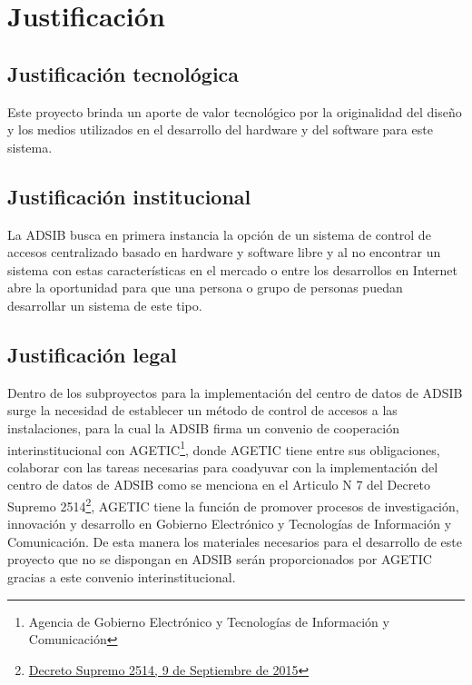 \documentclass[../principal.tex]{subfiles}
\begin{document}
  \section{Justificación}

  \subsection{Justificación tecnológica}

  Este proyecto brinda un aporte de valor tecnológico por la originalidad del diseño y los medios utilizados en el desarrollo del hardware y del software para este sistema.

  \subsection{Justificación institucional}

  La ADSIB busca en primera instancia la opción de un sistema de control de accesos centralizado basado en hardware y software libre y al no encontrar un sistema con estas características en el mercado o entre los desarrollos en Internet abre la oportunidad para que una persona o grupo de personas puedan desarrollar un sistema de este tipo.

  \subsection{Justificación legal}

  Dentro de los subproyectos para la implementación del centro de datos de ADSIB surge la necesidad de establecer un método de control de accesos a las instalaciones, para la cual la ADSIB firma un convenio de cooperación interinstitucional con AGETIC\footnote{Agencia de Gobierno Electrónico y Tecnologías de Información y Comunicación}, donde AGETIC tiene entre sus obligaciones, colaborar con las tareas necesarias para coadyuvar con la implementación del centro de datos de ADSIB como se menciona en el Articulo N\degree{} 7 del Decreto Supremo 2514\footnote{\href{http://www.derechoteca.com/gacetabolivia/decreto-supremo-no-2514-del-09-de-septiembre-de-2015/}{Decreto Supremo 2514, 9 de Septiembre de 2015}}, AGETIC tiene la función de promover procesos de investigación, innovación y desarrollo en Gobierno Electrónico y Tecnologías de Información y Comunicación. De esta manera los materiales necesarios para el desarrollo de este proyecto que no se dispongan en ADSIB serán proporcionados por AGETIC gracias a este convenio interinstitucional.
\end{document}
